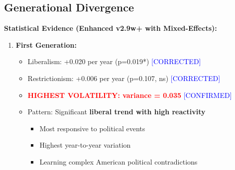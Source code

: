 

\subsection{Generational Divergence}

\textbf{Statistical Evidence (Enhanced v2.9w+ with Mixed-Effects):}

\begin{enumerate}
    \item \textbf{First Generation:}
        \begin{itemize}
            \item Liberalism: +0.020 per year (p=0.019*) \textcolor{blue}{[CORRECTED]}
            \item Restrictionism: +0.006 per year (p=0.107, ns) \textcolor{blue}{[CORRECTED]}
            \item \textcolor{red}{\textbf{HIGHEST VOLATILITY: variance = 0.035}} \textcolor{blue}{[CONFIRMED]}
            \item Pattern: Significant \textbf{liberal trend with high reactivity}
                \begin{itemize}
                    \item Most responsive to political events
                    \item Highest year-to-year variation
                    \item Learning complex American political contradictions
                \end{itemize}
        \end{itemize}


\end{enumerate}
